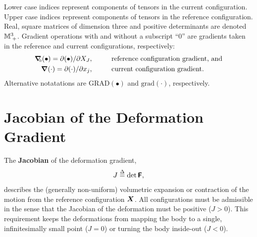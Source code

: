 Lower case indices represent components of tensors in the current configuration.  Upper case indices represent components of tensors in the reference configuration.  Real, square matrices of dimension three and positive determinants are denoted $\mathbb{M}^{3}_{\; +}$.  Gradient operations with and without a subscript ``$0$'' are gradients taken in the reference and current configurations, respectively:
\begin{align}
\mbox{\boldmath $\nabla$}_{\hspace{-1mm}\mbox{\tiny 0}}(\bullet) = \partial (\bullet) / \partial X_J, & \hspace{1cm} \mbox{reference configuration gradient, and} \\
\mbox{\boldmath $\nabla$}(\cdot) = \partial (\cdot) / \partial x_j, & \hspace{1cm} \mbox{current configuration gradient}.
\end{align}
Alternative notatations are $\mbox{GRAD}(\bullet)$ and $\mbox{grad}(\cdot)$, respectively.

\section{Jacobian of the Deformation Gradient}
The {\bf Jacobian} of the deformation gradient, 
\begin{equation}
 J \stackrel{\Delta}{=} \det \mbox{\sffamily\bfseries F},
\end{equation}
describes the (generally non-uniform) volumetric expansion or contraction of the motion from the reference configuration $\mbox{\boldmath $X$}$.  All configurations must be admissible in the sense that the Jacobian of the deformation must be positive ($J > 0$). This requirement keeps the deformations from mapping the body to a single, infinitesimally small point ($J=0$) or turning the body inside-out ($J<0$).  


